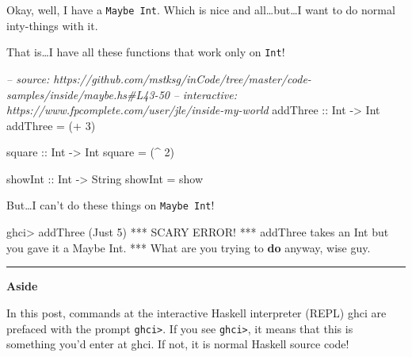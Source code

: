 \documentclass[]{article}
\newenvironment{Shaded}{\begin{snugshade}}{\end{snugshade}}
\newcommand{\CommentTok}[1]{\textcolor[rgb]{0.56,0.35,0.01}{\textit{#1}}}
\newcommand{\DataTypeTok}[1]{\textcolor[rgb]{0.13,0.29,0.53}{#1}}
\newcommand{\DecValTok}[1]{\textcolor[rgb]{0.00,0.00,0.81}{#1}}
\newcommand{\FunctionTok}[1]{\textcolor[rgb]{0.00,0.00,0.00}{#1}}
\newcommand{\KeywordTok}[1]{\textcolor[rgb]{0.13,0.29,0.53}{\textbf{#1}}}
\newcommand{\NormalTok}[1]{#1}
\newcommand{\OtherTok}[1]{\textcolor[rgb]{0.56,0.35,0.01}{#1}}
\begin{document}
Okay, well, I have a \texttt{Maybe\ Int}. Which is nice and
all\ldots{}but\ldots{}I want to do normal inty-things with it.

That is\ldots{}I have all these functions that work only on \texttt{Int}!

\begin{Shaded}
\begin{Highlighting}[]
\CommentTok{-- source: https://github.com/mstksg/inCode/tree/master/code-samples/inside/maybe.hs#L43-50}
\CommentTok{-- interactive: https://www.fpcomplete.com/user/jle/inside-my-world}
\OtherTok{addThree ::} \DataTypeTok{Int} \OtherTok{->} \DataTypeTok{Int}
\NormalTok{addThree }\FunctionTok{=}\NormalTok{ (}\FunctionTok{+} \DecValTok{3}\NormalTok{)}

\OtherTok{square ::} \DataTypeTok{Int} \OtherTok{->} \DataTypeTok{Int}
\NormalTok{square }\FunctionTok{=}\NormalTok{ (}\FunctionTok{^} \DecValTok{2}\NormalTok{)}

\NormalTok{showInt}\OtherTok{ ::} \DataTypeTok{Int} \OtherTok{->} \DataTypeTok{String}
\NormalTok{showInt }\FunctionTok{=}\NormalTok{ show}
\end{Highlighting}
\end{Shaded}

But\ldots{}I can't do these things on \texttt{Maybe\ Int}!

\begin{Shaded}
\begin{Highlighting}[]
\NormalTok{ghci}\FunctionTok{>}\NormalTok{ addThree (}\DataTypeTok{Just} \DecValTok{5}\NormalTok{)}
\FunctionTok{***} \DataTypeTok{SCARY} \DataTypeTok{ERROR}\FunctionTok{!}
\FunctionTok{***}\NormalTok{ addThree takes an }\DataTypeTok{Int}\NormalTok{ but you gave it a }\DataTypeTok{Maybe} \DataTypeTok{Int}\FunctionTok{.}
\FunctionTok{***} \DataTypeTok{What}\NormalTok{ are you trying to }\KeywordTok{do}\NormalTok{ anyway, wise guy}\FunctionTok{.}
\end{Highlighting}
\end{Shaded}

\begin{center}\rule{0.5\linewidth}{\linethickness}\end{center}

\textbf{Aside}

In this post, commands at the interactive Haskell interpreter (REPL) ghci are
prefaced with the prompt \texttt{ghci\textgreater{}}. If you see
\texttt{ghci\textgreater{}}, it means that this is something you'd enter at
ghci. If not, it is normal Haskell source code!
\end{document}
